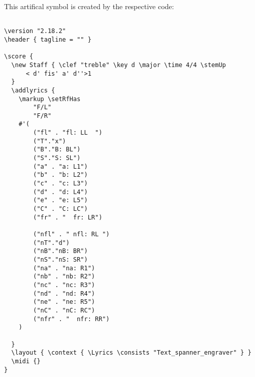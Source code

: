 \documentclass[
  DIV=calc,
  BCOR=5mm,
  12pt,
  headings=small,
  oneside,
  abstract=true,
  toc=bib,
  xcolor=dvipsnames,
  openany,
  english]{scrartcl}
\begin{document}
\begin{center}
\end{center}

This artifical symbol is created by the respective code:

\begin{scriptsize}
\begin{verbatim}

\version "2.18.2"
\header { tagline = "" }

\score {
  \new Staff { \clef "treble" \key d \major \time 4/4 \stemUp
      < d' fis' a' d''>1
  }
  \addlyrics {
    \markup \setRfHas
        "F/L"
        "F/R"
    #'(
        ("fl" . "fl: LL  ")
        ("T"."x")
        ("B"."B: BL")
        ("S"."S: SL")
        ("a" . "a: L1")
        ("b" . "b: L2")
        ("c" . "c: L3")
        ("d" . "d: L4")
        ("e" . "e: L5")
        ("C" . "C: LC")
        ("fr" . "  fr: LR")

        ("nfl" . " nfl: RL ")
        ("nT"."d")
        ("nB"."nB: BR")
        ("nS"."nS: SR")
        ("na" . "na: R1")
        ("nb" . "nb: R2")
        ("nc" . "nc: R3")
        ("nd" . "nd: R4")
        ("ne" . "ne: R5")
        ("nC" . "nC: RC")
        ("nfr" . "  nfr: RR")
    )

  }
  \layout { \context { \Lyrics \consists "Text_spanner_engraver" } }
  \midi {}
}
\end{verbatim}
\end{scriptsize}
\end{document}
